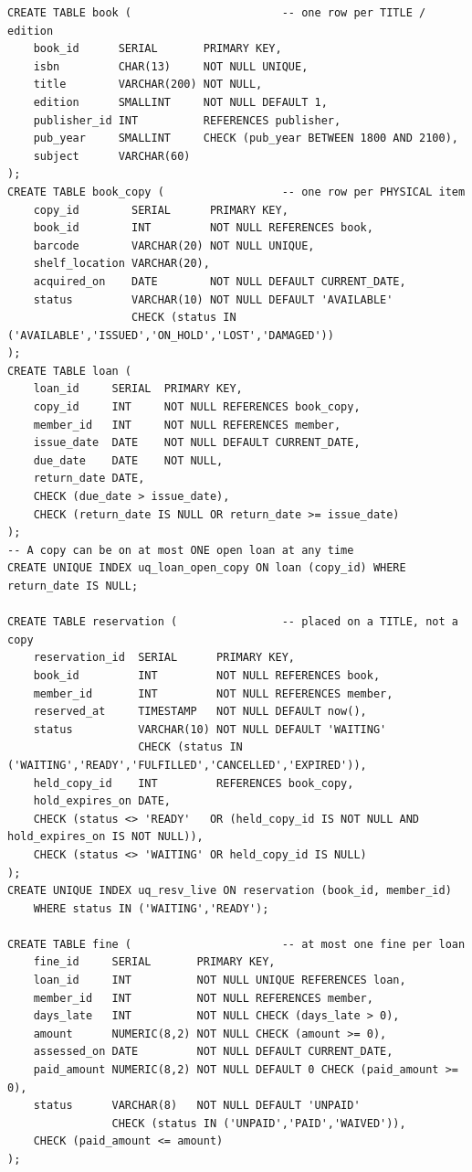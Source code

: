 \documentclass[11pt,a4paper]{report}
\begin{document}
\begin{lstlisting}[caption={Core tables and constraints (from \texttt{01\_schema.sql})}, label={lst:schema}]
CREATE TABLE book (                       -- one row per TITLE / edition
    book_id      SERIAL       PRIMARY KEY,
    isbn         CHAR(13)     NOT NULL UNIQUE,
    title        VARCHAR(200) NOT NULL,
    edition      SMALLINT     NOT NULL DEFAULT 1,
    publisher_id INT          REFERENCES publisher,
    pub_year     SMALLINT     CHECK (pub_year BETWEEN 1800 AND 2100),
    subject      VARCHAR(60)
);
CREATE TABLE book_copy (                  -- one row per PHYSICAL item
    copy_id        SERIAL      PRIMARY KEY,
    book_id        INT         NOT NULL REFERENCES book,
    barcode        VARCHAR(20) NOT NULL UNIQUE,
    shelf_location VARCHAR(20),
    acquired_on    DATE        NOT NULL DEFAULT CURRENT_DATE,
    status         VARCHAR(10) NOT NULL DEFAULT 'AVAILABLE'
                   CHECK (status IN ('AVAILABLE','ISSUED','ON_HOLD','LOST','DAMAGED'))
);
CREATE TABLE loan (
    loan_id     SERIAL  PRIMARY KEY,
    copy_id     INT     NOT NULL REFERENCES book_copy,
    member_id   INT     NOT NULL REFERENCES member,
    issue_date  DATE    NOT NULL DEFAULT CURRENT_DATE,
    due_date    DATE    NOT NULL,
    return_date DATE,
    CHECK (due_date > issue_date),
    CHECK (return_date IS NULL OR return_date >= issue_date)
);
-- A copy can be on at most ONE open loan at any time
CREATE UNIQUE INDEX uq_loan_open_copy ON loan (copy_id) WHERE return_date IS NULL;

CREATE TABLE reservation (                -- placed on a TITLE, not a copy
    reservation_id  SERIAL      PRIMARY KEY,
    book_id         INT         NOT NULL REFERENCES book,
    member_id       INT         NOT NULL REFERENCES member,
    reserved_at     TIMESTAMP   NOT NULL DEFAULT now(),
    status          VARCHAR(10) NOT NULL DEFAULT 'WAITING'
                    CHECK (status IN ('WAITING','READY','FULFILLED','CANCELLED','EXPIRED')),
    held_copy_id    INT         REFERENCES book_copy,
    hold_expires_on DATE,
    CHECK (status <> 'READY'   OR (held_copy_id IS NOT NULL AND hold_expires_on IS NOT NULL)),
    CHECK (status <> 'WAITING' OR held_copy_id IS NULL)
);
CREATE UNIQUE INDEX uq_resv_live ON reservation (book_id, member_id)
    WHERE status IN ('WAITING','READY');

CREATE TABLE fine (                       -- at most one fine per loan
    fine_id     SERIAL       PRIMARY KEY,
    loan_id     INT          NOT NULL UNIQUE REFERENCES loan,
    member_id   INT          NOT NULL REFERENCES member,
    days_late   INT          NOT NULL CHECK (days_late > 0),
    amount      NUMERIC(8,2) NOT NULL CHECK (amount >= 0),
    assessed_on DATE         NOT NULL DEFAULT CURRENT_DATE,
    paid_amount NUMERIC(8,2) NOT NULL DEFAULT 0 CHECK (paid_amount >= 0),
    status      VARCHAR(8)   NOT NULL DEFAULT 'UNPAID'
                CHECK (status IN ('UNPAID','PAID','WAIVED')),
    CHECK (paid_amount <= amount)
);
\end{lstlisting}
\end{document}
